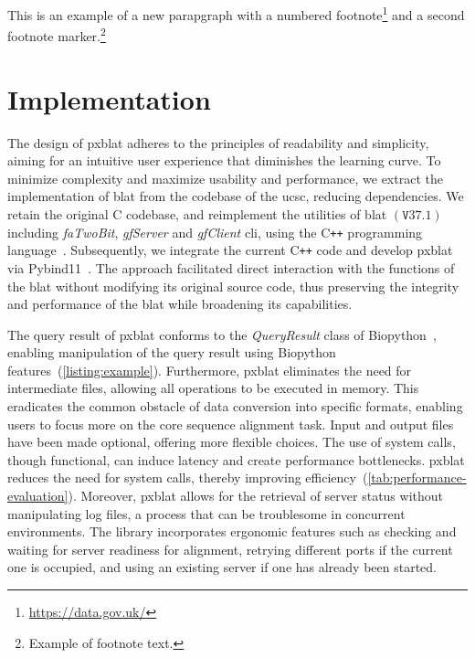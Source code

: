 \documentclass[unnumsec,webpdf,contemporary,large]{oup-authoring-template}%
\theoremstyle{thmstyleone}%
\theoremstyle{thmstyletwo}%
\theoremstyle{thmstylethree}%
\newcommand\pCref[1]{(\ref{#1})}
\begin{document}
This is an example of a new parapgraph with a numbered footnote\footnote{\url{https://data.gov.uk/}} and a second footnote marker.\footnote{Example of footnote text.}

\section{Implementation}\label{sec:implementation}

The design of \gls{pxblat} adheres to the principles of readability and simplicity, aiming for an intuitive user experience that diminishes the learning curve.
To minimize complexity and maximize usability and performance, we extract the implementation of \gls{blat} from the codebase of the \gls{ucsc}, reducing dependencies.
We retain the original C codebase, and reimplement the utilities of \gls{blat} \(\left(\mathtt{V}37.1\right)\) including \emph{faTwoBit}, \emph{gfServer} and \emph{gfClient} \gls{cli}, using the C\texttt{++} programming language~\citep{kent2002blat}.
Subsequently, we integrate the current C\texttt{++} code and develop \gls{pxblat} via Pybind11~\citep{pybind11}.
The approach facilitated direct interaction with the functions of the \gls{blat} without modifying its original source code, thus preserving the integrity and performance of the \gls{blat} while broadening its capabilities.

The query result of \gls{pxblat} conforms to the \emph{QueryResult} class of Biopython~\citep{cock2009biopython}, enabling  manipulation of the query result using Biopython features~\pCref{listing:example}.
Furthermore, \gls{pxblat} eliminates the need for intermediate files, allowing all operations to be executed in memory.
This eradicates the common obstacle of data conversion into specific formats, enabling users to focus more on the core sequence alignment task.
Input and output files have been made optional, offering more flexible choices.
The use of system calls, though functional, can induce latency and create performance bottlenecks.
\gls{pxblat} reduces the need for system calls, thereby improving efficiency~\pCref{tab:performance-evaluation}.
Moreover, \gls{pxblat} allows for the retrieval of server status without manipulating log files, a process that can be troublesome in concurrent environments.
The library incorporates ergonomic features such as checking and waiting for server readiness for alignment, retrying different ports if the current one is occupied, and using an existing server if one has already been started.
\end{document}
